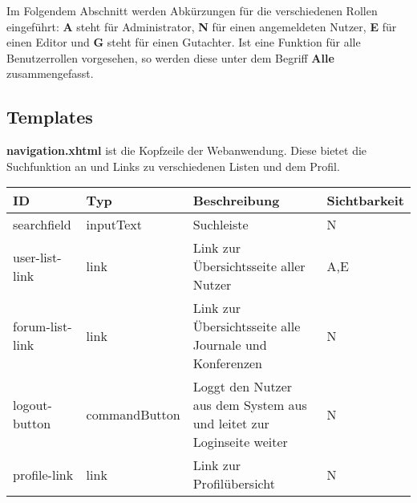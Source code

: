 \newcommand{\ftable}[1]{\begin{longtable}[H]{|m{2cm}|m{3cm}|m{6cm}|m{2.5cm}|}
                            \hline
                            \textbf{ID} & \textbf{Typ} & \textbf{Beschreibung} & \textbf{Sichtbarkeit} \\
                            \hline
                            \hline
                            #1
\end{longtable}
}

\newcommand{\fentry}[4]{#1 & #2 & #3 & #4 \\
\hline}



Im Folgendem Abschnitt werden Abkürzungen für die verschiedenen Rollen eingeführt:
\textbf{A} steht für Administrator, \textbf{N} für einen angemeldeten Nutzer, \textbf{E} für einen Editor und \textbf{G} steht für einen Gutachter.
Ist eine Funktion für alle Benutzerrollen vorgesehen, so werden diese unter dem Begriff \textbf{Alle} zusammengefasst.



\subsection{Templates}



\begin{samepage}
    \textbf{navigation.xhtml} ist die Kopfzeile der Webanwendung. Diese bietet die Suchfunktion an und Links zu verschiedenen Listen und dem Profil.
    \nopagebreak

    \ftable{
        \fentry{searchfield}{inputText}{Suchleiste}{N }

        \fentry{user-list-link}{link}{Link zur Übersichtsseite aller Nutzer}{A,E}

        \fentry{forum-list-link}{link}{Link zur Übersichtsseite alle Journale und Konferenzen}{N}

        \fentry{logout-button}{commandButton}{Loggt den Nutzer aus dem System aus und leitet zur Loginseite weiter}{N}

        \fentry{profile-link}{link}{Link zur Profilübersicht}{N}

    }
\end{samepage}

